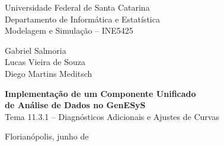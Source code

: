 \documentclass[11pt,a4paper]{article}
\begin{document}
\begin{titlepage}
    \centering
    \vspace*{1.5cm}

    {\large Universidade Federal de Santa Catarina}\\[0.2cm]
    {\large Departamento de Informática e Estatística}\\[0.2cm]
    {\large Modelagem e Simulação -- INE5425}

    \vspace{2.5cm}

    {\large Gabriel Salmoria}\\[0.15cm]
    {\large Lucas Vieira de Souza}\\[0.15cm]
    {\large Diego Martins Meditsch}

    \vspace{2.5cm}

    {\LARGE \textbf{Implementação de um Componente Unificado\\[0.3cm]
    de Análise de Dados no GenESyS}}\\[0.5cm]
    {\large Tema 11.3.1 -- Diagnósticos Adicionais e Ajustes de Curvas}

    \vfill

    {\large Florianópolis, junho de \the\year}
\end{titlepage}

\tableofcontents
\newpage


\newpage


\newpage


\newpage


\newpage

\nocite{*}

\end{document}
